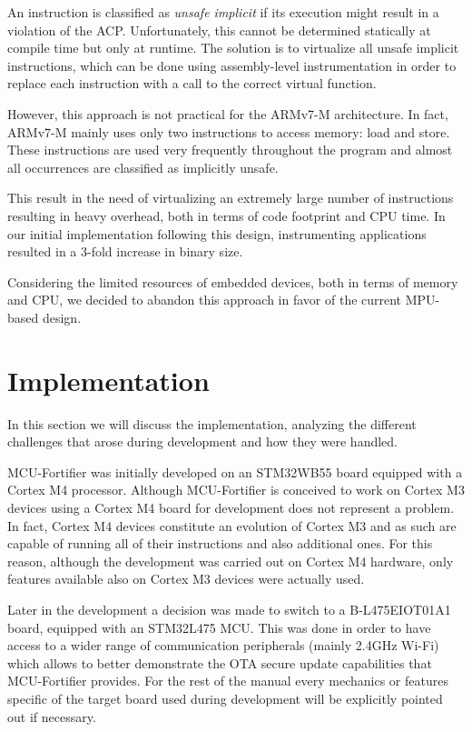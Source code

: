 \documentclass{article}
\begin{document}
An instruction is classified as \textit{unsafe implicit} if its execution might result in a violation of the ACP. Unfortunately, this cannot be determined statically at compile time but only at runtime.
The solution is to virtualize all unsafe implicit instructions, which can be done using assembly-level instrumentation in order to replace each instruction with a call to the correct virtual function.

However, this approach is not practical for the ARMv7-M architecture. In fact, ARMv7-M mainly uses only two instructions to access memory: load and store. These instructions are used very frequently throughout the program and almost all occurrences are classified as implicitly unsafe.

This result in the need of virtualizing an extremely large number of instructions resulting in heavy overhead, both in terms of code footprint and CPU time. In our initial implementation following this design, instrumenting applications resulted in a 3-fold increase in binary size.

Considering the limited resources of embedded devices, both in terms of memory and CPU, we decided to abandon this approach in favor of the current MPU-based design.

\newpage
\section{Implementation}
\label{sec:implementation}
In this section we will discuss the implementation, analyzing the different challenges that arose during development and how they were handled.

MCU-Fortifier was initially developed on an STM32WB55 board equipped with a Cortex M4 processor. Although MCU-Fortifier is conceived to work on Cortex M3 devices using a Cortex M4 board for development does not represent a problem. In fact, Cortex M4 devices constitute an evolution of Cortex M3 and as such are capable of running all of their instructions and also additional ones. For this reason, although the development was carried out on Cortex M4 hardware, only features available also on Cortex M3 devices were actually used.

Later in the development a decision was made to switch to a B-L475EIOT01A1 board, equipped with an STM32L475 MCU. This was done in order to have access to a wider range of communication peripherals (mainly 2.4GHz Wi-Fi) which allows to better demonstrate the OTA secure update capabilities that MCU-Fortifier provides. For the rest of the manual every mechanics or features specific of the target board used during development will be explicitly pointed out if necessary.
\end{document}
